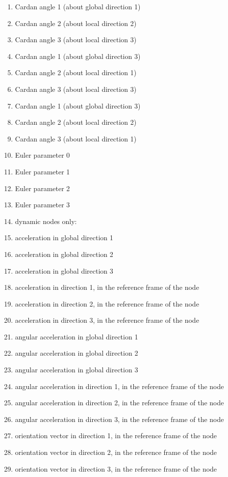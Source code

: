 \begin{enumerate}
\item {} Cardan angle 1 (about global direction 1)
\item {} Cardan angle 2 (about local direction 2)
\item {} Cardan angle 3 (about local direction 3)
\item {} Cardan angle 1 (about global direction 3)
\item {} Cardan angle 2 (about local direction 1)
\item {} Cardan angle 3 (about local direction 3)
\item {} Cardan angle 1 (about global direction 3)
\item {} Cardan angle 2 (about local direction 2)
\item {} Cardan angle 3 (about local direction 1)
\item {} Euler parameter 0
\item {} Euler parameter 1
\item {} Euler parameter 2
\item {} Euler parameter 3
\item[] dynamic nodes only:
\item {} acceleration in global direction 1
\item {} acceleration in global direction 2
\item {} acceleration in global direction 3
\item {} acceleration in direction 1, in the reference frame of the node
\item {} acceleration in direction 2, in the reference frame of the node
\item {} acceleration in direction 3, in the reference frame of the node
\item {} angular acceleration in global direction 1
\item {} angular acceleration in global direction 2
\item {} angular acceleration in global direction 3
\item {} angular acceleration in direction 1, in the reference frame of the node
\item {} angular acceleration in direction 2, in the reference frame of the node
\item {} angular acceleration in direction 3, in the reference frame of the node
\item {} orientation vector in direction 1, in the reference frame of the node
\item {} orientation vector in direction 2, in the reference frame of the node
\item {} orientation vector in direction 3, in the reference frame of the node
\end{enumerate}


